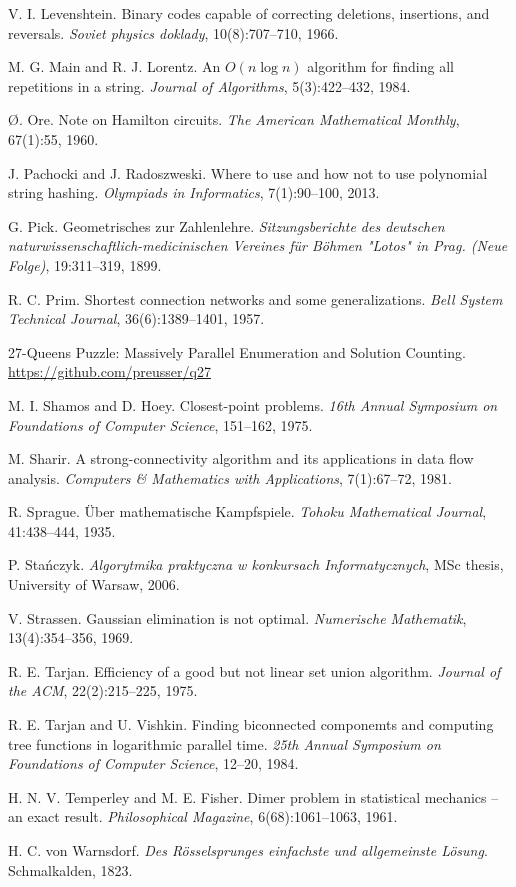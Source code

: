 \begin{thebibliography}{9}
  V. I. Levenshtein.
  Binary codes capable of correcting deletions, insertions, and reversals.
  \emph{Soviet physics doklady}, 10(8):707--710, 1966.

  M. G. Main and R. J. Lorentz.
  An $O(n \log n)$ algorithm for finding all repetitions in a string.
  \emph{Journal of Algorithms}, 5(3):422--432, 1984.

  Ø. Ore.
  Note on Hamilton circuits.
  \emph{The American Mathematical Monthly}, 67(1):55, 1960.

  J. Pachocki and J. Radoszweski.
  Where to use and how not to use polynomial string hashing.
  \emph{Olympiads in Informatics}, 7(1):90--100, 2013.

  G. Pick.
  Geometrisches zur Zahlenlehre.
  \emph{Sitzungsberichte des deutschen naturwissenschaftlich-medicinischen Vereines
  für Böhmen "Lotos" in Prag. (Neue Folge)}, 19:311--319, 1899.

  R. C. Prim.
  Shortest connection networks and some generalizations.
  \emph{Bell System Technical Journal}, 36(6):1389--1401, 1957.

  27-Queens Puzzle: Massively Parallel Enumeration and Solution Counting.
  \url{https://github.com/preusser/q27}

  M. I. Shamos and D. Hoey.
  Closest-point problems.
  \emph{16th Annual Symposium on Foundations of Computer Science}, 151--162, 1975.

  M. Sharir.
  A strong-connectivity algorithm and its applications in data flow analysis.
  \emph{Computers \& Mathematics with Applications}, 7(1):67--72, 1981.

  R. Sprague.
  Über mathematische Kampfspiele.
  \emph{Tohoku Mathematical Journal}, 41:438--444, 1935.

  P. Stańczyk.
  \emph{Algorytmika praktyczna w konkursach Informatycznych},
  MSc thesis, University of Warsaw, 2006.

  V. Strassen.
  Gaussian elimination is not optimal.
  \emph{Numerische Mathematik}, 13(4):354--356, 1969.

  R. E. Tarjan.
  Efficiency of a good but not linear set union algorithm.
  \emph{Journal of the ACM}, 22(2):215--225, 1975.

  R. E. Tarjan and U. Vishkin.
  Finding biconnected componemts and computing tree functions in logarithmic parallel time.
  \emph{25th Annual Symposium on Foundations of Computer Science}, 12--20, 1984.

  H. N. V. Temperley and M. E. Fisher.
  Dimer problem in statistical mechanics -- an exact result.
  \emph{Philosophical Magazine}, 6(68):1061--1063, 1961.

  H. C. von Warnsdorf.
  \emph{Des Rösselsprunges einfachste und allgemeinste Lösung}.
  Schmalkalden, 1823.

\end{thebibliography}